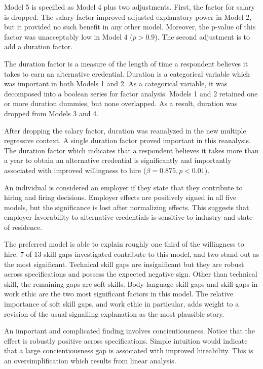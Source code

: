 \documentclass[review]{elsarticle}
\begin{document}
Model 5 is specified as Model 4 plus two adjustments.
First, the factor for salary is dropped.
The salary factor improved adjusted explanatory power in Model 2, but it provided no such benefit in any other model.
Moreover, the p-value of this factor was unacceptably low in Model 4 ($p > 0.9$).
The second adjustment is to add a duration factor.

The duration factor is a measure of the length of time a respondent believes it takes to earn an alternative credential.
Duration is a categorical variable which was important in both Models 1 and 2.
As a categorical variable, it was decomposed into a boolean series for factor analysis.
Models 1 and 2 retained one or more duration dummies, but none overlapped.
As a result, duration was dropped from Models 3 and 4.

After dropping the salary factor, duration was reanalyzed in the new multiple regressive context.
A single duration factor proved important in this reanalysis.
The duration factor which indicates that a respondent believes it takes more than a year to obtain an alternative credential
is significantly and importantly associated with improved willingness to hire ($\beta = 0.875, p < 0.01$).

An individual is considered an employer if they state that they contribute to hiring and firing decisions.
Employer effects are positively signed in all five models, but the significance is lost after normalizing effects.
This suggests that employer favorability to alternative credentials is sensitive to industry and state of residence.

The preferred model is able to explain roughly one third of the willingness to hire.
7 of 13 skill gaps investigated contribute to this model, and two stand out as the most significant.
Technical skill gaps are insignificant but they are robust across specifications and possess the expected negative sign.
Other than technical skill, the remaining gaps are soft skills.
Body language skill gaps and skill gaps in work ethic are the two most significant factors in this model.
The relative importance of soft skill gaps, and work ethic in particular, adds weight to a revision of the usual signalling explanation as the most plausible story.

An important and complicated finding involves concientiousness.
Notice that the effect is robustly positive across specifications.
Simple intuition would indicate that a large concientiousness gap is associated with improved hireability.
This is an oversimplification which results from linear analysis.
\end{document}
